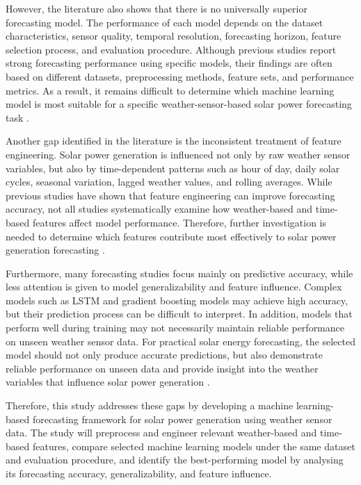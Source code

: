 However, the literature also shows that there is no universally superior forecasting model. The performance of each model depends on the dataset characteristics, sensor quality, temporal resolution, forecasting horizon, feature selection process, and evaluation procedure. Although previous studies report strong forecasting performance using specific models, their findings are often based on different datasets, preprocessing methods, feature sets, and performance metrics. As a result, it remains difficult to determine which machine learning model is most suitable for a specific weather-sensor-based solar power forecasting task \parencite{TsaiLo2025, Alhassan2025, CarvalhoJunior2025}.

Another gap identified in the literature is the inconsistent treatment of feature engineering. Solar power generation is influenced not only by raw weather sensor variables, but also by time-dependent patterns such as hour of day, daily solar cycles, seasonal variation, lagged weather values, and rolling averages. While previous studies have shown that feature engineering can improve forecasting accuracy, not all studies systematically examine how weather-based and time-based features affect model performance. Therefore, further investigation is needed to determine which features contribute most effectively to solar power generation forecasting \parencite{JnanaVarshitha2025, Pongphaw2025, TsaiLo2025}.

Furthermore, many forecasting studies focus mainly on predictive accuracy, while less attention is given to model generalizability and feature influence. Complex models such as LSTM and gradient boosting models may achieve high accuracy, but their prediction process can be difficult to interpret. In addition, models that perform well during training may not necessarily maintain reliable performance on unseen weather sensor data. For practical solar energy forecasting, the selected model should not only produce accurate predictions, but also demonstrate reliable performance on unseen data and provide insight into the weather variables that influence solar power generation \parencite{Eren2025, Levent2025, Ozdemir2025}.

Therefore, this study addresses these gaps by developing a machine learning-based forecasting framework for solar power generation using weather sensor data. The study will preprocess and engineer relevant weather-based and time-based features, compare selected machine learning models under the same dataset and evaluation procedure, and identify the best-performing model by analysing its forecasting accuracy, generalizability, and feature influence.

